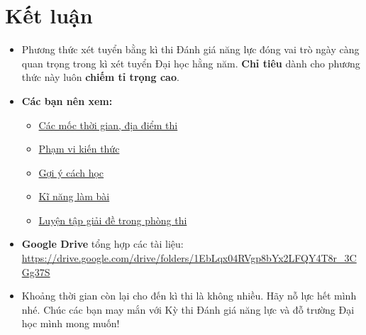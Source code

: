 \section{Kết luận}
\begin{itemize}
    \item Phương thức xét tuyển bằng kì thi Đánh giá năng lực đóng vai trò ngày càng quan trọng trong kì xét tuyển Đại học hằng năm. \textbf{Chỉ tiêu} dành cho phương thức này luôn \textbf{chiếm tỉ trọng cao}.
    \item \textbf{Các bạn nên xem:} 
    \begin{itemize}
        \item \hyperref[sec:thoigiandiadiem]{Các mốc thời gian, địa điểm thi}
        \item \hyperref[sec:phamvikienthuc]{Phạm vi kiến thức}
        \item \hyperref[sec:goiycachhoc]{Gợi ý cách học}
        \item \hyperref[sec:kinanglambai]{Kĩ năng làm bài}
        \item \hyperref[sec:giaidephongthi]{Luyện tập giải đề trong phòng thi}
    \end{itemize}
    \item \textbf{Google Drive} tổng hợp các tài liệu: \\ \href{https://drive.google.com/drive/folders/1EbLqx04RVgp8bYx2LFQY4T8r_3CGg37S}{https://drive.google.com/drive/folders/1EbLqx04RVgp8bYx2LFQY4T8r\_3CGg37S} \cite{tonghoptailieu}
    \item Khoảng thời gian còn lại cho đến kì thi là không nhiều. Hãy nỗ lực hết mình nhé. Chúc các bạn may mắn với Kỳ thi Đánh giá năng lực và đỗ trường Đại học mình mong muốn!
\end{itemize}